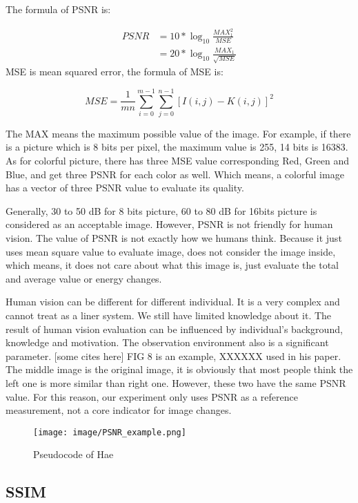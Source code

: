\documentclass[%
    reprint,
    amsmath,amssymb,
    aps,
   ]{revtex4-1}
\begin{document}
   The formula of PSNR is:
   
   \begin{align*}  
   PSNR    &=  10* \log_{10} \frac{MAX^2_{1}}{MSE} \\
           &=  20 *\log_{10} \frac{MAX_{1}}{\sqrt{MSE}}
   \end{align*} 
   MSE is mean squared error, the formula of MSE is:
   
   $$MSE = \frac{1}{mn}\sum_{i=0}^{m-1}\sum_{j=0}^{n-1} [I(i,j)-K(i,j)]^2$$
   
   The MAX means the maximum possible value of the image. For example, if there is a picture which is 8 bits per pixel, the maximum value is 255, 14 bits is 16383. As for colorful picture, there has three MSE value corresponding Red, Green and Blue, and get three PSNR for each color as well. Which means, a colorful image has a vector of three PSNR value to evaluate its quality.
   
   
   Generally, 30 to 50 dB for 8 bits picture, 60 to 80 dB for 16bits picture is considered as an acceptable image. However, PSNR is not friendly for human vision. The value of PSNR is not exactly how we humans think. Because it just uses mean square value to evaluate image, does not consider the image inside, which means, it does not care about what this image is, just evaluate the total and average value or energy changes.
   
   Human vision can be different for different individual. It is a very complex and cannot treat as a liner system. We still have limited knowledge about it. The result of human vision evaluation can be influenced by individual’s background, knowledge and motivation. The observation environment also is a significant parameter. [some cites here] FIG 8 is an example, XXXXXX used in his paper. The middle image is the original image, it is obviously that most people think the left one is more similar than right one. However, these two have the same PSNR value. For this reason, our experiment only uses PSNR as a reference measurement, not a core indicator for image changes.
   
   \begin{figure}[h]
   \texttt{[image: image/PSNR\_example.png]}
   \caption{Pseudocode of Hae}
   \label{fig:figure}
   \end{figure} 
   
   
   \subsection{\label{sec:level2}SSIM}
   
\end{document}
